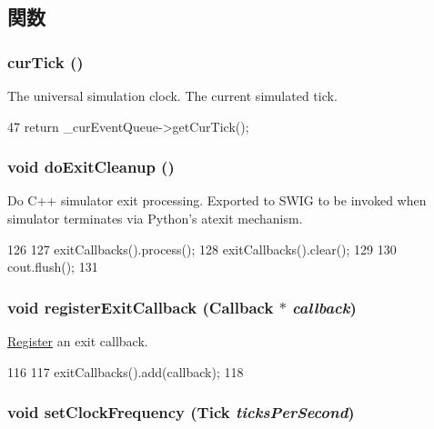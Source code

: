 \subsection{関数}
\hypertarget{core_8hh_a7acdccbf0d35ce0c159c0cdd36371b22}{
\subsubsection[{curTick}]{ curTick ()}}
\label{core_8hh_a7acdccbf0d35ce0c159c0cdd36371b22}


The universal simulation clock. The current simulated tick. 


\begin{DoxyCode}
47 { return _curEventQueue->getCurTick(); }
\end{DoxyCode}
\hypertarget{core_8hh_a77e16fe0c066fb9cde89cf37cfe3d2c7}{
\subsubsection[{doExitCleanup}]{\setlength{\rightskip}{0pt plus 5cm}void doExitCleanup ()}}
\label{core_8hh_a77e16fe0c066fb9cde89cf37cfe3d2c7}
Do C++ simulator exit processing. Exported to SWIG to be invoked when simulator terminates via Python's atexit mechanism. 


\begin{DoxyCode}
126 {
127     exitCallbacks().process();
128     exitCallbacks().clear();
129 
130     cout.flush();
131 }
\end{DoxyCode}
\hypertarget{core_8hh_acbc78ce26c7964097d562909c589d585}{
\subsubsection[{registerExitCallback}]{\setlength{\rightskip}{0pt plus 5cm}void registerExitCallback ({\bf Callback} $\ast$ {\em callback})}}
\label{core_8hh_acbc78ce26c7964097d562909c589d585}
\hyperlink{classRegister}{Register} an exit callback. 


\begin{DoxyCode}
116 {
117     exitCallbacks().add(callback);
118 }
\end{DoxyCode}
\hypertarget{core_8hh_a563bf37014962b47bb575473a2d75d93}{
\subsubsection[{setClockFrequency}]{\setlength{\rightskip}{0pt plus 5cm}void setClockFrequency ({\bf Tick} {\em ticksPerSecond})}}
\label{core_8hh_a563bf37014962b47bb575473a2d75d93}



